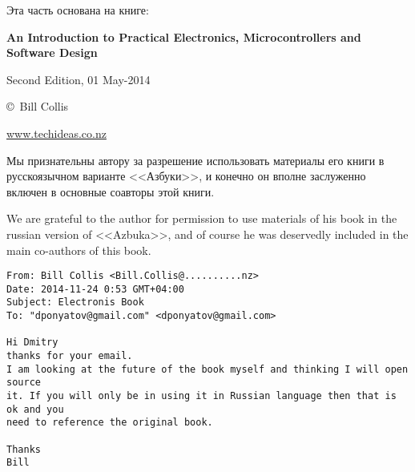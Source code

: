 
Эта часть основана на книге:
\bigskip

\textbf{An Introduction to 
Practical Electronics, 
Microcontrollers and
Software Design}

Second Edition, 01 May-2014

\copyright\ Bill Collis

\url{www.techideas.co.nz}

\bigskip
Мы признательны автору за разрешение использовать материалы его книги в
русскоязычном варианте <<Азбуки>>, и конечно он вполне заслуженно включен в
основные соавторы этой книги.

\bigskip
We are grateful to the author for permission to use materials of his book in the
russian version of <<Azbuka>>, and of course he was deservedly included in the
main co-authors of this book.

\bigskip
\begin{verbatim}
From: Bill Collis <Bill.Collis@..........nz>
Date: 2014-11-24 0:53 GMT+04:00
Subject: Electronis Book
To: "dponyatov@gmail.com" <dponyatov@gmail.com>

Hi Dmitry
thanks for your email.
I am looking at the future of the book myself and thinking I will open source
it. If you will only be in using it in Russian language then that is ok and you
need to reference the original book.

Thanks
Bill
\end{verbatim}
